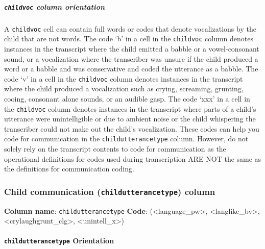\documentclass[
  12pt,
]{book}
\begin{document}
\hypertarget{childvoc-column-orientation}{%
\subparagraph*{\texorpdfstring{\texttt{childvoc} column orientation}{childvoc column orientation}}\label{childvoc-column-orientation}}

A \texttt{childvoc} cell can contain full words or codes that denote vocalizations by the child that are not words.
The code `b' in a cell in the \texttt{childvoc} column denotes instances in the transcript where the child emitted a babble or a vowel-consonant sound, or a vocalization where the transcriber was unsure if the child produced a word or a babble and was conservative and coded the utterance as a babble.
The code `v' in a cell in the \texttt{childvoc} column denotes instances in the transcript where the child produced a vocalization such as crying, screaming, grunting, cooing, consonant alone sounds, or an audible gasp.
The code `xxx' in a cell in the \texttt{childvoc} column denotes instances in the transcript where parts of a child's utterance were unintelligible or due to ambient noise or the child whispering the transcriber could not make out the child's vocalization.
These codes can help you code for communication in the \texttt{childutterancetype} column. However, do not solely rely on the transcript contents to code for communication as the operational definitions for codes used during transcription ARE NOT the same as the definitions for communication coding.

\hypertarget{child-communication-childutterancetype-column}{%
\subsubsection*{\texorpdfstring{Child communication (\texttt{childutterancetype}) column}{Child communication (childutterancetype) column}}\label{child-communication-childutterancetype-column}}

\textbf{Column name}: \texttt{childutterancetype}
\textbf{Code}: (\textless language\_pw\textgreater, \textless langlike\_bv\textgreater, \textless crylaughgrunt\_clg\textgreater, \textless unintell\_x\textgreater)

\hypertarget{childutterancetype-orientation}{%
\paragraph*{\texorpdfstring{\texttt{childutterancetype} Orientation}{childutterancetype Orientation}}\label{childutterancetype-orientation}}
\end{document}
